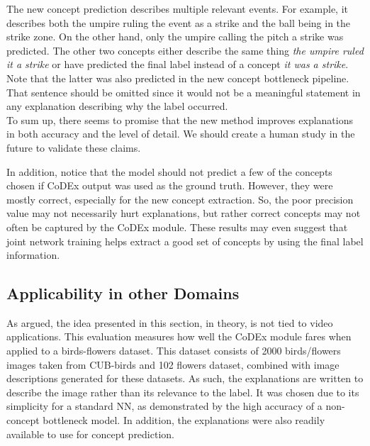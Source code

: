 The new concept prediction describes multiple relevant events. 
For example, it describes both the umpire ruling the event as a strike and the ball being in the strike zone.
On the other hand, only the umpire calling the pitch a strike was predicted. 
The other two concepts either describe the same thing \emph{the umpire ruled it a strike} or have predicted the final label instead of a concept \emph{it was a strike}.
Note that the latter was also predicted in the new concept bottleneck pipeline. 
That sentence should be omitted since it would not be a meaningful statement in any explanation describing why the label occurred. \\

To sum up, there seems to promise that the new method improves explanations in both accuracy and the level of detail.
We should create a human study in the future to validate these claims.

In addition, notice that the model should not predict a few of the concepts chosen if CoDEx output was used as the ground truth.
However, they were mostly correct, especially for the new concept extraction.
So, the poor precision value may not necessarily hurt explanations, but rather correct concepts may not often be captured by the CoDEx module.
These results may even suggest that joint network training helps extract a good set of concepts by using the final label information. 


\subsection{Applicability in other Domains}
\label{applicability-in-other-domains}


As argued, the idea presented in this section, in theory, is not tied to video applications.
This evaluation measures how well the CoDEx module fares when applied to a birds-flowers dataset.
This dataset consists of 2000 birds/flowers images taken from CUB-birds \cite{RefWorks:RefID:87-wah2011caltech-ucsd} and 102 flowers \cite{RefWorks:RefID:70-nilsback2008automated} dataset, combined with image descriptions generated for these datasets.
As such, the explanations are written to describe the image rather than its relevance to the label.
It was chosen due to its simplicity for a standard NN, as demonstrated by the high accuracy of a non-concept bottleneck model. 
In addition, the explanations were also readily available to use for concept prediction.

